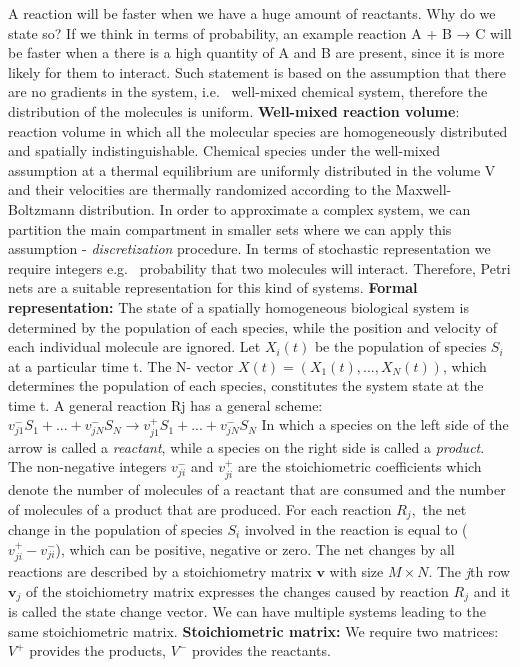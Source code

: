 A reaction will be faster when we have a huge amount of reactants.
Why do we state so? If we think in terms of probability, an example reaction A + B → C will be faster when a there is a high quantity of A and B are present, since it is more likely for them to interact.
Such statement is based on the assumption that there are no gradients in the system, i.e. ~well-mixed chemical system, therefore the distribution of the molecules is uniform.
\textbf{Well-mixed reaction volume}: reaction volume in which all the molecular species are homogeneously distributed and spatially indistinguishable.
Chemical species under the well-mixed assumption at a thermal equilibrium are uniformly distributed in the volume V and their velocities are thermally randomized according to the Maxwell-Boltzmann distribution.
In order to approximate a complex system, we can partition the main compartment in smaller sets where we can apply this assumption - \emph{discretization} procedure.
In terms of stochastic representation we require integers e.g. ~probability that two molecules will interact.
Therefore, Petri nets are a suitable representation for this kind of systems.
\textbf{Formal representation:} The state of a spatially homogeneous biological system is determined by the population of each species, while the position and velocity of each individual molecule are ignored.
Let $X_i(t)$ be the population of species $S_i$ at a particular time t.
The N- vector $X(t) = (X_1(t),...,X_N(t))$, which determines the population of each species, constitutes the system state at the time t.
A general reaction Rj has a general scheme: $v^-_{j1}S_1+...+v^-_{jN}S_N \rightarrow v^+_{j1}S_1+...+v^-_{jN}S_N$ In which a species on the left side of the arrow is called a \emph{reactant}, while a species on the right side is called a \emph{product}.
The non-negative integers $v^-_{ji}$ and $v^+_{ji}$ are the stoichiometric coefficients which denote the number of molecules of a reactant that are consumed and the number of molecules of a product that are produced.
For each reaction $R_j,$ the net change in the population of species $S_i$ involved in the reaction is equal to ($v^+_{ji}- v^-_{ji}$), which can be positive, negative or zero.
The net changes by all reactions are described by a stoichiometry matrix $\mathbf{v}$ with size $M × N$.
The \emph{j}th row $\mathbf{v}_j$ of the stoichiometry matrix expresses the changes caused by reaction $R_j$ and it is called the state change vector.
We can have multiple systems leading to the same stoichiometric matrix.
\textbf{Stoichiometric matrix:}
We require two matrices: $V^+$ provides the products, $V^-$ provides the reactants.

